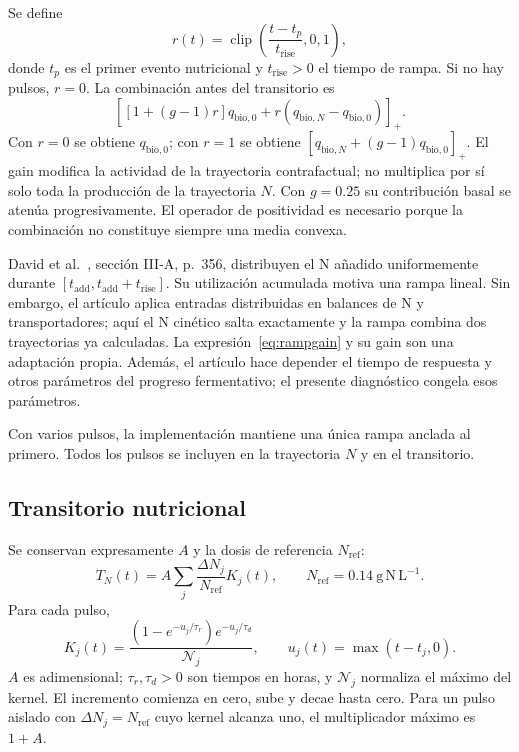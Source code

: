 \documentclass[11pt,a4paper]{article}
\newcommand{\pos}[1]{\left[#1\right]_+}
\newcommand{\clip}{\operatorname{clip}}
\begin{document}
Se define
\begin{equation}
r(t)=\clip\left(\frac{t-t_p}{t_{\mathrm{rise}}},0,1\right),
\label{eq:ramp}
\end{equation}
donde $t_p$ es el primer evento nutricional y $t_{\mathrm{rise}}>0$ el tiempo
de rampa. Si no hay pulsos, $r=0$. La combinación antes del transitorio es
\begin{equation}
\pos{[1+(g-1)r]q_{\mathrm{bio},0}
+r(q_{\mathrm{bio},N}-q_{\mathrm{bio},0})}.
\label{eq:rampgain}
\end{equation}
Con $r=0$ se obtiene $q_{\mathrm{bio},0}$; con $r=1$ se obtiene
$[q_{\mathrm{bio},N}+(g-1)q_{\mathrm{bio},0}]_+$.
El gain modifica la actividad de la trayectoria contrafactual; no multiplica
por sí solo toda la producción de la trayectoria $N$. Con $g=0.25$ su
contribución basal se atenúa progresivamente. El operador de positividad es
necesario porque la combinación no constituye siempre una media convexa.

David et al.~\cite{david2012}, sección III-A, p.~356, distribuyen el N añadido
uniformemente durante $[t_{\mathrm{add}},t_{\mathrm{add}}+t_{\mathrm{rise}}]$.
Su utilización acumulada motiva una rampa lineal. Sin embargo, el artículo
aplica entradas distribuidas en balances de N y transportadores; aquí el N
cinético salta exactamente y la rampa combina dos trayectorias ya calculadas.
La expresión~\eqref{eq:rampgain} y su gain son una adaptación propia.
Además, el artículo hace depender el tiempo de respuesta y otros parámetros
del progreso fermentativo; el presente diagnóstico congela esos parámetros.

Con varios pulsos, la implementación mantiene una única rampa anclada al
primero. Todos los pulsos se incluyen en la trayectoria $N$ y en el transitorio.

\subsection{Transitorio nutricional}
\label{sec:transient}

Se conservan expresamente $A$ y la dosis de referencia $N_{\mathrm{ref}}$:
\begin{equation}
\boxed{T_N(t)=A\sum_j\frac{\Delta N_j}{N_{\mathrm{ref}}}K_j(t),
\qquad N_{\mathrm{ref}}=0.14\ \mathrm{g\,N\,L^{-1}}.}
\label{eq:TN}
\end{equation}
Para cada pulso,
\begin{equation}
K_j(t)=\frac{(1-e^{-u_j/\tau_r})e^{-u_j/\tau_d}}{\mathcal N_j},
\qquad u_j(t)=\max(t-t_j,0).
\label{eq:kernel}
\end{equation}
$A$ es adimensional; $\tau_r,\tau_d>0$ son tiempos en horas, y
$\mathcal N_j$ normaliza el máximo del kernel. El incremento comienza en cero,
sube y decae hasta cero. Para un pulso aislado con
$\Delta N_j=N_{\mathrm{ref}}$ cuyo kernel alcanza uno, el multiplicador máximo
es $1+A$.
\end{document}
